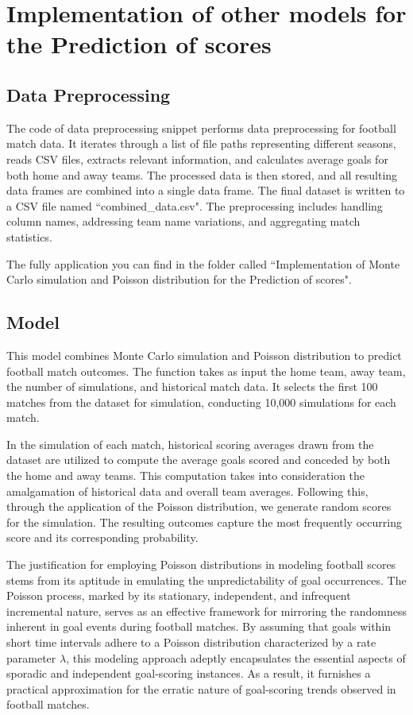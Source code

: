 \documentclass[12pt]{article}
\begin{document}
\section{Implementation of other models for the Prediction of scores}

\subsection{Data Preprocessing}
The code of data preprocessing snippet performs data preprocessing for football match data. It iterates through a list of file paths representing different seasons, reads CSV files, extracts relevant information, and calculates average goals for both home and away teams. The processed data is then stored, and all resulting data frames are combined into a single data frame. The final dataset is written to a CSV file named ``combined\_data.csv". The preprocessing includes handling column names, addressing team name variations, and aggregating match statistics.

The fully application you can find in the folder called ``Implementation of Monte Carlo simulation and Poisson distribution for the Prediction of scores".

\subsection{Model}
This model combines Monte Carlo simulation and Poisson distribution to predict football match outcomes. The function takes as input the home team, away team, the number of simulations, and historical match data. It selects the first 100 matches from the dataset for simulation, conducting 10,000 simulations for each match. 

In the simulation of each match, historical scoring averages drawn from the dataset are utilized to compute the average goals scored and conceded by both the home and away teams. This computation takes into consideration the amalgamation of historical data and overall team averages. Following this, through the application of the Poisson distribution, we generate random scores for the simulation. The resulting outcomes capture the most frequently occurring score and its corresponding probability.

The justification for employing Poisson distributions in modeling football scores stems from its aptitude in emulating the unpredictability of goal occurrences. The Poisson process, marked by its stationary, independent, and infrequent incremental nature, serves as an effective framework for mirroring the randomness inherent in goal events during football matches. By assuming that goals within short time intervals adhere to a Poisson distribution characterized by a rate parameter $\lambda$, this modeling approach adeptly encapsulates the essential aspects of sporadic and independent goal-scoring instances. As a result, it furnishes a practical approximation for the erratic nature of goal-scoring trends observed in football matches.
\end{document}
